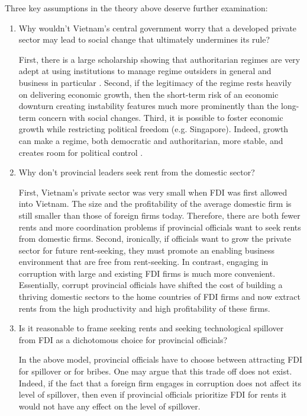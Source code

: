 Three key assumptions in the theory above deserve further examination:
\begin{enumerate}
\item Why wouldn't Vietnam's central government worry that a developed private sector may lead to social change that ultimately undermines its rule?

First, there is a large scholarship showing that authoritarian regimes are very adept at using institutions to manage regime outsiders in general and business in particular \citep{Gandhi2006, Gandhi2008, Wright2008, Le2015}. Second, if the legitimacy of the regime rests heavily on delivering economic growth, then the short-term risk of an economic downturn creating instability features much more prominently than the long-term concern with social changes. Third, it is possible to foster economic growth while restricting political freedom (e.g. Singapore). Indeed, growth can make a regime, both democratic and authoritarian, more stable, and creates room for political control \citep{Przeworski1997}.

\item Why don't provincial leaders seek rent from the domestic sector? 

First, Vietnam's private sector was very small when FDI was first allowed into Vietnam. The size and the profitability of the average domestic firm is still smaller than those of foreign firms today. Therefore, there are both fewer rents and more coordination problems if provincial officials want to seek rents from domestic firms. Second, ironically, if officials want to grow the private sector for future rent-seeking, they must promote an enabling business environment that are free from rent-seeking. In contrast, engaging in corruption with large and existing FDI firms is much more convenient. Essentially, corrupt provincial officials have shifted the cost of building a thriving domestic sectors to the home countries of FDI firms and now extract rents from the high productivity and high profitability of these firms. 

\item Is it reasonable to frame seeking rents and seeking technological spillover from FDI as a dichotomous choice for provincial officials?

In the above model, provincial officials have to choose between attracting FDI for spillover or for bribes. One may argue that this trade off does not exist. Indeed, if the fact that a foreign firm engages in corruption does not affect its level of spillover, then even if provincial officials prioritize FDI for rents it would not have any effect on the level of spillover.


\end{enumerate}

